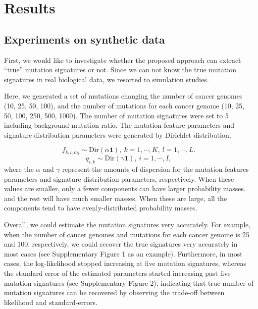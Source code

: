 \section*{Results}

\subsection*{Experiments on synthetic data}

First, we would like to investigate whether the proposed approach can extract ``true'' mutation signatures or not.
Since we can not know the true mutation signatures in real biological data, we resorted to simulation studies.

Here, we generated a set of mutations changing the number of cancer genomes (10, 25, 50, 100), 
and the number of mutations for each cancer genome (10, 25, 50, 100, 250, 500, 1000).
The number of mutation signatures were set to 5 including background mutation ratio.
The mutation feature parameters and signature distribution parameters were generated by Dirichlet distribution,

\begin{equation*}
 f_{k,l,m_l} \sim \text{Dir} (\alpha \bm{1} ),\ k = 1, \cdots, K,\  l = 1, \cdots, L.
\end{equation*}
 \begin{equation*}
 q_{i, k} \sim \text{Dir} (\gamma \bm{1} ),\ i = 1, \cdots, I,
 \end{equation*}
where the $\alpha$ and $\gamma$ represent the amounts of dispersion 
for the mutation features parameters and signature distribution parameters, respectively.
When these values are smaller, only a fewer components can have larger probability masses.
and the rest will have much smaller masses.  
When these are large, all the components tend to have evenly-distributed probability masses.
 
Overall, we could estimate the mutation signatures very accurately.
For example, when the number of cancer genomes and mutations for each cancer genome is 25 and 100, respectively,
we could recover the true signatures very accurately in most cases (see Supplementary Figure 1 as an example).
Furthermore, in most cases, the log-likelihood stopped increasing at five mutation signatures, 
whereas the standard error of the estimated parameters started increasing past five mutation signatures (see Supplementary Figure 2),
indicating that true number of mutation signatures can be recovered by observing the trade-off between likelihood and standard-errors.

